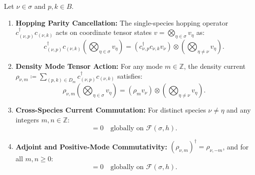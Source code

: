 \begin{theorem}
\label{thm:hopping_tensor}
Let $\nu \in \sigma$ and $p, k \in B$.
\begin{enumerate}
    \item \textbf{Hopping Parity Cancellation:} The single-species hopping operator $c_{(\nu, p)}^\dagger c_{(\nu, k)}$ acts on coordinate tensor states $v = \bigotimes_{\eta \in \sigma} v_\eta$ as:
    \begin{equation}
    c_{(\nu, p)}^\dagger c_{(\nu, k)} \left( \bigotimes_{\eta \in \sigma} v_\eta \right) = \left( c_{\nu, p}^\dagger c_{\nu, k} v_\nu \right) \otimes \left( \bigotimes_{\eta \neq \nu} v_\eta \right).
    \end{equation}
    \item \textbf{Density Mode Tensor Action:} For any mode $m \in \mathbb{Z}$, the density current $\rho_{\nu, m} \coloneqq \sum_{(p, k) \in D_m} c_{(\nu, p)}^\dagger c_{(\nu, k)}$ satisfies:
    \begin{equation}
    \rho_{\nu, m} \left( \bigotimes_{\eta \in \sigma} v_\eta \right) = \left( \rho_m v_\nu \right) \otimes \left( \bigotimes_{\eta \neq \nu} v_\eta \right).
    \end{equation}
    \item \textbf{Cross-Species Current Commutation:} For distinct species $\nu \neq \eta$ and any integers $m, n \in \mathbb{Z}$:
    \begin{equation}
    [\rho_{\nu, m}, \; \rho_{\eta, n}] = 0 \quad \text{globally on } \mathcal{F}(\sigma, h).
    \end{equation}
    \item \textbf{Adjoint and Positive-Mode Commutativity:} $(\rho_{\nu, m})^\dagger = \rho_{\nu, -m}$, and for all $m, n \ge 0$:
    \begin{equation}
    [\rho_{\nu, m}, \; \rho_{\nu, n}] = 0 \quad \text{globally on } \mathcal{F}(\sigma, h).
    \end{equation}
\end{enumerate}
\end{theorem}

